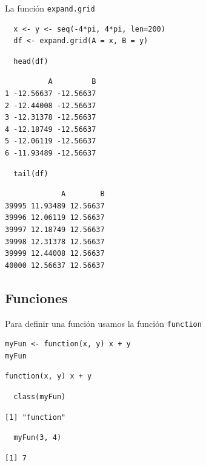 \documentclass[xcolor={usenames,svgnames,dvipsnames}]{beamer}
\begin{document}
\begin{frame}[fragile,label=sec-2-4-3]{La función \texttt{expand.grid}}
 \lstset{language=R,label= ,caption= ,numbers=none}
\begin{lstlisting}
  x <- y <- seq(-4*pi, 4*pi, len=200)
  df <- expand.grid(A = x, B = y)
\end{lstlisting}

\lstset{language=R,label= ,caption= ,numbers=none}
\begin{lstlisting}
  head(df)
\end{lstlisting}

\begin{verbatim}
          A         B
1 -12.56637 -12.56637
2 -12.44008 -12.56637
3 -12.31378 -12.56637
4 -12.18749 -12.56637
5 -12.06119 -12.56637
6 -11.93489 -12.56637
\end{verbatim}

\lstset{language=R,label= ,caption= ,numbers=none}
\begin{lstlisting}
  tail(df)
\end{lstlisting}

\begin{verbatim}
             A        B
39995 11.93489 12.56637
39996 12.06119 12.56637
39997 12.18749 12.56637
39998 12.31378 12.56637
39999 12.44008 12.56637
40000 12.56637 12.56637
\end{verbatim}
\end{frame}

\subsection{Funciones}
\label{sec-2-5}

\begin{frame}[fragile,label=sec-2-5-1]{Para definir una función usamos la función \texttt{function}}
 \lstset{language=R,label= ,caption= ,numbers=none}
\begin{lstlisting}
myFun <- function(x, y) x + y
myFun
\end{lstlisting}

\begin{verbatim}
function(x, y) x + y
\end{verbatim}

\lstset{language=R,label= ,caption= ,numbers=none}
\begin{lstlisting}
  class(myFun)
\end{lstlisting}

\begin{verbatim}
[1] "function"
\end{verbatim}


\lstset{language=R,label= ,caption= ,numbers=none}
\begin{lstlisting}
  myFun(3, 4)
\end{lstlisting}

\begin{verbatim}
[1] 7
\end{verbatim}
\end{frame}
\end{document}
